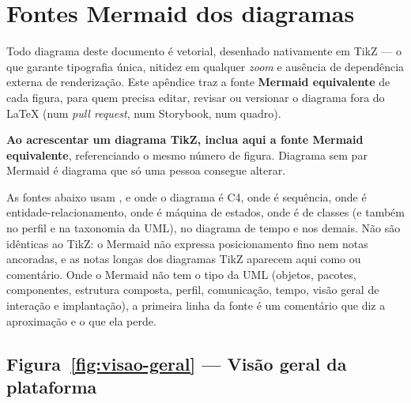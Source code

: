 \chapter{Fontes Mermaid dos diagramas}
\label{ap:mermaid}

Todo diagrama deste documento é vetorial, desenhado nativamente em TikZ --- o que
garante tipografia única, nitidez em qualquer \emph{zoom} e ausência de
dependência externa de renderização. Este apêndice traz a fonte
\textbf{Mermaid equivalente} de cada figura, para quem precisa editar, revisar ou
versionar o diagrama fora do \LaTeX{} (num \emph{pull request}, num Storybook, num
quadro).

\begin{regra}
\textbf{Ao acrescentar um diagrama TikZ, inclua aqui a fonte Mermaid
equivalente}, referenciando o mesmo número de figura. Diagrama sem par Mermaid é
diagrama que só uma pessoa consegue alterar.
\end{regra}

\begin{nota}
As fontes abaixo usam ,  e  onde o
diagrama é C4,  onde é sequência,  onde é
entidade-relacionamento,  onde é máquina de estados,
 onde é de classes (e também no perfil e na taxonomia da UML),
 no diagrama de tempo e  nos demais. Não são idênticas ao
TikZ: o Mermaid não expressa posicionamento fino nem notas ancoradas, e as notas
longas dos diagramas TikZ aparecem aqui como  ou comentário. Onde o
Mermaid não tem o tipo da UML (objetos, pacotes, componentes, estrutura composta,
perfil, comunicação, tempo, visão geral de interação e implantação), a primeira
linha da fonte é um comentário que diz a aproximação e o que ela perde.
\end{nota}

\section{Figura~\ref{fig:visao-geral} --- Visão geral da plataforma}

